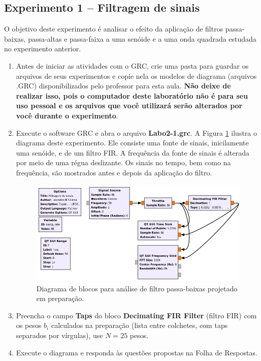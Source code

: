 \documentclass[12pt,addpoints]{exam}
\newcommand{\myscale}{0.4}
\begin{document}
\subsection{Experimento 1 -- Filtragem de sinais}

O objetivo deste experimento é analisar o efeito da aplicação de filtros passa-baixas, passa-altas e passa-faixa a uma senóide e a uma onda quadrada estudada no experimento anterior.

  \begin{enumerate}
    \item Antes de iniciar as atividades com o GRC, crie uma pasta para guardar os arquivos de seus experimentos e copie nela os modelos de diagrama (arquivos .GRC) disponibilizados pelo professor para esta aula. \textbf{Não deixe de realizar isso, pois o computador deste laboratório não é para seu uso pessoal e os arquivos que você utilizará serão alterados por você durante o experimento}.
    \item Execute o software GRC e abra o arquivo \textbf{Labo2-1.grc}. A Figura \ref{fig:GRC_2-1} ilustra o diagrama deste experimento. Ele consiste uma fonte de sinais, inicilamente uma senóide, e de um filtro FIR. A frequência da fonte de sinais é alterada por meio de uma régua deslizante. Os sinais no tempo, bem como na frequência, são mostrados antes e depois da aplicação do filtro.
    \begin{figure}[htb]
        \centering
        \includegraphics[scale=\myscale]{./Figuras/GRC_2-1a}
        \caption{Diagrama de blocos para análise de filtro passa-baixas projetado em preparação.} 
        \label{fig:GRC_2-1}
    \end{figure}
    \item Preencha o campo \textbf{Taps} do bloco \textbf{Decimating FIR Filter} (filtro FIR) com os pesos $b_i$ calculados na preparação (lista entre colchetes, com taps separados por vírgulas), use $N=25$ pesos.
    \item Execute o diagrama e responda às questões propostas na Folha de Respostas.
\end{enumerate}
\end{document}
